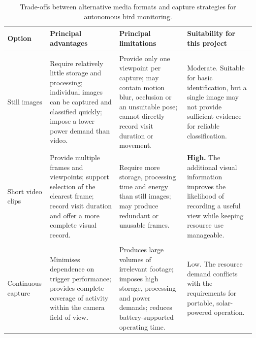 \begin{table}[htbp]
    \centering
    \caption{Trade-offs between alternative media formats and capture strategies for autonomous bird monitoring.}
    \label{tab:capture-strategy-tradeoffs}

    \footnotesize
    \setlength{\tabcolsep}{4.5pt}
    \renewcommand{\arraystretch}{1.22}

    \begin{tabularx}{\textwidth}{
        >{\raggedright\arraybackslash}p{}
        >{\raggedright\arraybackslash}X
        >{\raggedright\arraybackslash}X
        >{\raggedright\arraybackslash}p{}
    }
        \toprule
        \textbf{Option}
        & \textbf{Principal advantages}
        & \textbf{Principal limitations}
        & \textbf{Suitability for this project} \\
        \midrule

        \multicolumn{4}{l}{
            \textbf{\textit{Media format}}
        } \\
        \addlinespace[2pt]

        Still images
        & Require relatively little storage and processing; individual images can be captured and classified quickly; impose a lower power demand than video.
        & Provide only one viewpoint per capture; may contain motion blur, occlusion or an unsuitable pose; cannot directly record visit duration or movement.
        & Moderate. Suitable for basic identification, but a single image may not provide sufficient evidence for reliable classification. \\

        \addlinespace

        Short video clips
        & Provide multiple frames and viewpoints; support selection of the clearest frame; record visit duration and offer a more complete visual record.
        & Require more storage, processing time and energy than still images; may produce redundant or unusable frames.
        & \textbf{High.} The additional visual information improves the likelihood of recording a useful view while keeping resource use manageable. \\

        \midrule

        \multicolumn{4}{l}{
            \textbf{\textit{Capture activation}}
        } \\
        \addlinespace[2pt]

        Continuous capture
        & Minimises dependence on trigger performance; provides complete coverage of activity within the camera field of view.
        & Produces large volumes of irrelevant footage; imposes high storage, processing and power demands; reduces battery-supported operating time.
        & Low. The resource demand conflicts with the requirements for portable, solar-powered operation. \\


\end{tabularx}
\end{table}
